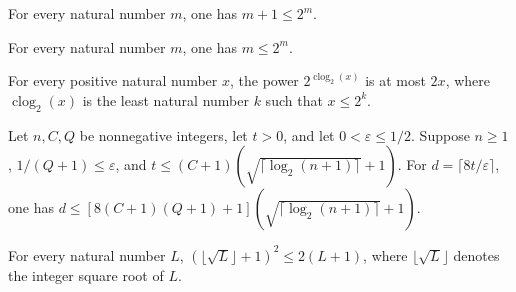 \begin{theorem}
\label{FABL.nat_succ_le_two_pow}
\leanok
{}
For every natural number $m$, one has $m+1\le2^m$.
\end{theorem}

\begin{theorem}
\label{FABL.nat_self_le_two_pow}
\leanok
{}
For every natural number $m$, one has $m\le2^m$.
\end{theorem}

\begin{theorem}
\label{FABL.two_pow_clog_le_two_mul}
\leanok
{}
For every positive natural number $x$, the power $2^{\operatorname{clog}_2(x)}$ is at
most $2x$, where $\operatorname{clog}_2(x)$ is the least natural number $k$ such that
$x\le 2^k$.
\end{theorem}

\begin{theorem}
\label{FABL.learningConsequencesDegree_le_subsqrt}
\leanok
{}
Let $n,C,Q$ be nonnegative integers, let $t>0$, and let $0<\varepsilon\leq 1/2$. Suppose
$n\geq1$, $1/(Q+1)\leq\varepsilon$, and $t\leq(C+1)(\sqrt{\lceil\log_2(n+1)\rceil}+1)$.
For $d=\lceil 8t/\varepsilon\rceil$, one has
$d\leq[8(C+1)(Q+1)+1](\sqrt{\lceil\log_2(n+1)\rceil}+1)$.
\end{theorem}

\begin{theorem}
\label{FABL.sqrt_add_one_sq_le_two_mul_add_one}
\leanok
{}
For every natural number $L$, $(\lfloor\sqrt{L}\rfloor+1)^2\le 2(L+1)$, where
$\lfloor\sqrt{L}\rfloor$ denotes the integer square root of $L$.
\end{theorem}

